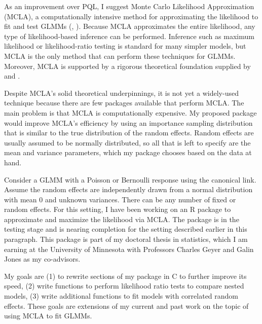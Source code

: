 \documentclass[12pt]{article}
\newcommand{\ncite}[1]{\citeauthor{#1}, \citeyear{#1}}
\begin{document}

As an improvement over PQL, I suggest  Monte Carlo  Likelihood Approximation (MCLA), a computationally intensive method for approximating the likelihood to fit and test GLMMs (\ncite{geyer:thom:1992}).   Because MCLA approximates the entire likelihood, any type of likelihood-based inference can be performed.  Inference such as maximum likelihood or likelihood-ratio testing is standard for many simpler models, but MCLA is the only method that can perform these techniques for GLMMs.  Moreover, MCLA is supported by a rigorous theoretical foundation supplied by \citet{geyer:1994} and  \citet{sung:geyer:2007}. 




Despite MCLA's solid theoretical underpinnings, it is not yet a widely-used technique because there are  few packages available that perform MCLA.  The main problem is that MCLA is  computationally expensive. My proposed package would improve MCLA's efficiency by using an importance sampling distribution that is similar to the true distribution of the random effects.  Random effects are usually assumed to be normally distributed, so all that is left to specify are the mean and variance parameters, which my  package chooses  based on the data at hand.
 




Consider a GLMM with a Poisson or Bernoulli response using the canonical link.  Assume the random effects are independently drawn from a normal distribution with mean 0 and unknown variances. There can be any number of fixed or random effects.  For this setting, I have been working on an R package to approximate and maximize the likelihood via MCLA.   The package is in the testing stage and is nearing completion for the setting described earlier in this paragraph.  This package is part of my doctoral thesis in statistics, which I am earning at the University of Minnesota with Professors Charles Geyer and Galin Jones as my co-advisors.




My goals are  (1) to rewrite sections of my package in C to further improve its speed, (2) write functions to perform likelihood ratio tests to compare nested models, (3) write additional functions to fit models with correlated random effects.  These goals are extensions of my current and past work on the topic of using MCLA to fit GLMMs.
\end{document}
